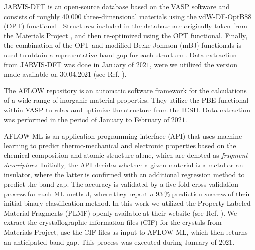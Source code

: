 \documentclass[superscriptaddress,unsortedaddress,
 amsmath,amssymb,
 aps,
]{revtex4-2}
\begin{document}
JARVIS-DFT \cite{Choudhary2020} is an open-source database based on the VASP software and consists of roughly $40.000$ three-dimensional materials using the vdW-DF-OptB88 (OPT) functional \cite{Thonhauser2007, Klimes2011}. Structures included in the database are originally taken from the Materials Project \cite{Jain2013, Jain2018}, and then re-optimized using the OPT functional. Finally, the combination of the OPT and modified Becke-Johnson (mBJ) functionals \cite{Tran2009} is used to obtain a representative band gap for each structure \cite{Choudhary2018a}. Data extraction from JARVIS-DFT was done in January of $2021$, were we utilized the version made available on 30.04.2021 (see Ref. \cite{Choudhary2020}).

The AFLOW \cite{Curtarolo2012, Curtarolo2012a, Calderon2015} repository is an automatic software framework for the calculations of a wide range of inorganic material properties. They utilize the PBE functional within VASP to relax and optimize the structure from the ICSD. Data extraction was performed in the period of January to February of $2021$.

AFLOW-ML \cite{Isayev2017} is an application programming interface (API) that uses machine learning to predict thermo-mechanical and electronic properties based on the chemical composition and atomic structure alone, which are denoted as \textit{fragment descriptors}. Initially, the API decides whether a given material is a metal or an insulator, where the latter is confirmed with an additional regression method to predict the band gap. The accuracy is validated by a five-fold cross-validation process for each ML method, where they report a $93 \ \%$ prediction success of their initial binary classification method. In this work we utilized the Property Labeled Material Fragments (PLMF) openly available at their website 
(see Ref. \cite{Isayev2017}).
We extract the crystallographic information files (CIF) for the crystals from Materials Project, use the CIF files as input to AFLOW-ML, which then returns an anticipated band gap. This process was executed during January of $2021$. 
\end{document}
